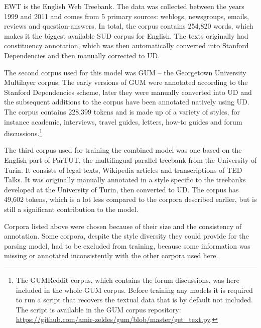 EWT is the English Web Treebank. The data was collected between the years 1999 and 2011 and comes from 5 primary sources: weblogs, newsgroups, emails, reviews and question-answers. In total, the corpus contains 254,820 words, which makes it the biggest available SUD corpus for English. The texts originally had constituency annotation, which was then automatically converted into Stanford Dependencies and then manually corrected to UD. 

The second corpus used for this model was GUM -- the Georgetown University Multilayer corpus. The early versions of GUM were annotated according to the Stanford Dependencies scheme, later they were manually converted into UD and the subsequent additions to the corpus have been annotated natively using UD. The corpus contains 228,399 tokens and is made up of a variety of styles, for instance academic, interviews, travel guides, letters, how-to guides and forum discussions.\footnote{The GUMReddit corpus, which contains the forum discussions, was here included in the whole GUM corpus. Before training any models it is required to run a script that recovers the textual data that is by default not included. The script is available in the GUM corpus repository: \url{https://github.com/amir-zeldes/gum/blob/master/get_text.py}.}

The third corpus used for training the combined model was one based on the English part of ParTUT, the multilingual parallel treebank from the University of Turin. It consists of legal texts, Wikipedia articles and transcriptions of TED Talks. It was originally manually annotated in a style specific to the treebanks developed at the University of Turin, then converted to UD. The corpus has 49,602 tokens, which is a lot less compared to the corpora described earlier, but is still a significant contribution to the model. 

Corpora listed above were chosen because of their size and the consistency of annotation. Some corpora, despite the style diversity they could provide for the parsing model, had to be excluded from training, because some information was missing or annotated inconsistently with the other corpora used here. 


